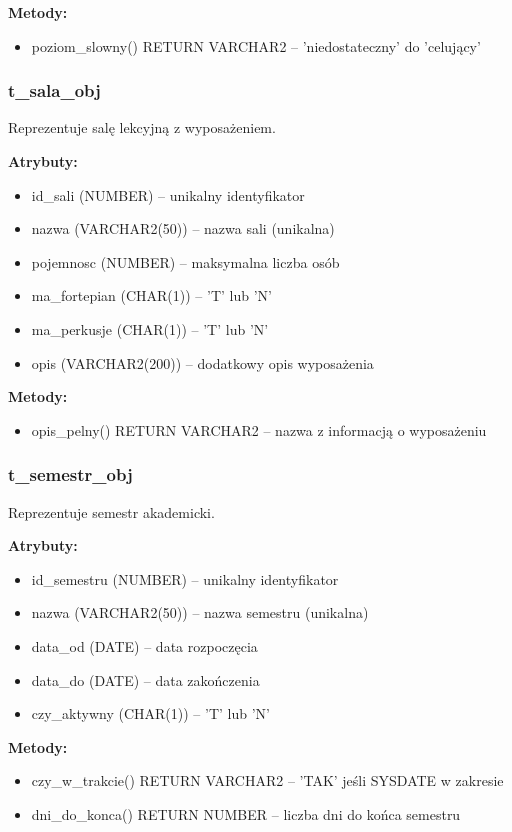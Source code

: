 \documentclass[12pt,a4paper]{article}
\begin{document}
\textbf{Metody:}
\begin{itemize}[nosep]
    \item poziom\_slowny() RETURN VARCHAR2 -- 'niedostateczny' do 'celujący'
\end{itemize}

\subsubsection{t\_sala\_obj}
Reprezentuje salę lekcyjną z wyposażeniem.

\textbf{Atrybuty:}
\begin{itemize}[nosep]
    \item id\_sali (NUMBER) -- unikalny identyfikator
    \item nazwa (VARCHAR2(50)) -- nazwa sali (unikalna)
    \item pojemnosc (NUMBER) -- maksymalna liczba osób
    \item ma\_fortepian (CHAR(1)) -- 'T' lub 'N'
    \item ma\_perkusje (CHAR(1)) -- 'T' lub 'N'
    \item opis (VARCHAR2(200)) -- dodatkowy opis wyposażenia
\end{itemize}

\textbf{Metody:}
\begin{itemize}[nosep]
    \item opis\_pelny() RETURN VARCHAR2 -- nazwa z informacją o wyposażeniu
\end{itemize}

\subsubsection{t\_semestr\_obj}
Reprezentuje semestr akademicki.

\textbf{Atrybuty:}
\begin{itemize}[nosep]
    \item id\_semestru (NUMBER) -- unikalny identyfikator
    \item nazwa (VARCHAR2(50)) -- nazwa semestru (unikalna)
    \item data\_od (DATE) -- data rozpoczęcia
    \item data\_do (DATE) -- data zakończenia
    \item czy\_aktywny (CHAR(1)) -- 'T' lub 'N'
\end{itemize}

\textbf{Metody:}
\begin{itemize}[nosep]
    \item czy\_w\_trakcie() RETURN VARCHAR2 -- 'TAK' jeśli SYSDATE w zakresie
    \item dni\_do\_konca() RETURN NUMBER -- liczba dni do końca semestru
\end{itemize}
\end{document}
